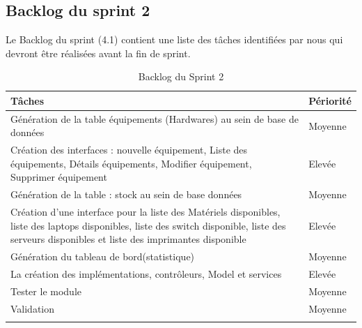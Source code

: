     \subsection{Backlog du sprint 2}
Le Backlog du sprint (4.1) contient une liste des tâches identifiées par nous qui devront être réalisées avant la fin de sprint.  
\newpage
            \begin{longtable}{|m{8cm}|m{4cm}|}
                
                \hline 
                    \textbf{Tâches} & \textbf{Périorité}\\
                \hline
                \endhead
                 \endfoot
                  \endlastfoot
                \hline  
                    Génération de la table équipements (Hardwares) au sein de base de données 
                    & Moyenne \\
            
                \hline
                    Création des interfaces : nouvelle équipement, Liste des équipements, Détails équipements, Modifier équipement, Supprimer équipement
                    & Elevée\\
            
                    
                \hline
                    Génération de la table : stock au sein de base données
                    & Moyenne \\
                    
                \hline
                    Création d’une interface pour la liste des Matériels disponibles, liste des laptops disponibles, liste des switch disponible, liste des serveurs disponibles et liste des imprimantes disponible 
                    & Elevée\\
                    
                \hline  
                    Génération du tableau de bord(statistique) 
                    & Moyenne\\
            
                \hline
                    La création des implémentations, contrôleurs, Model et services
                    & Elevée\\

                    
                \hline
                    Tester le module
                    & Moyenne\\
                
                \hline  
                    Validation
                    & Moyenne\\
                               
                \hline
            
                 
              \captionsetup{justification=centering,margin=2cm}
              \caption{Backlog du Sprint 2}

            \end{longtable}
            
